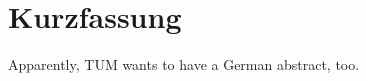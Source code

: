 \chapter{\abstractname}


\chapter{Kurzfassung}

Apparently, TUM wants to have a German abstract, too.
